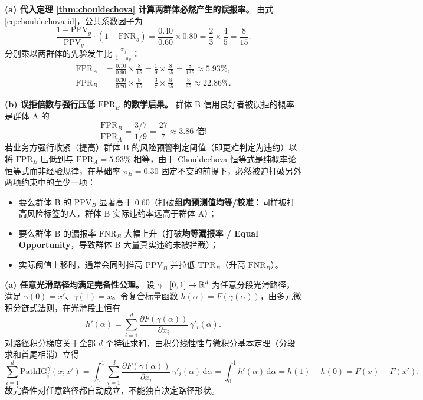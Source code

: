 \textbf{(a) 代入定理 \ref{thm:chouldechova} 计算两群体必然产生的误报率。}
由式 \eqref{eq:chouldechova-id}，公共系数因子为
\[
  \frac{1 - \mathrm{PPV}_g}{\mathrm{PPV}_g}\cdot(1 - \mathrm{FNR}_g)
  = \frac{0.40}{0.60} \times 0.80
  = \frac{2}{3} \times \frac{4}{5}
  = \frac{8}{15}.
\]
分别乘以两群体的先验发生比 $\frac{\pi_g}{1 - \pi_g}$：
\begin{align*}
  \mathrm{FPR}_A &= \frac{0.10}{0.90} \times \frac{8}{15}
                  = \frac{1}{9} \times \frac{8}{15}
                  = \frac{8}{135} \approx \mathbf{5.93\%}, \\
  \mathrm{FPR}_B &= \frac{0.30}{0.70} \times \frac{8}{15}
                  = \frac{3}{7} \times \frac{8}{15}
                  = \frac{8}{35} \approx \mathbf{22.86\%}.
\end{align*}

\textbf{(b) 误拒倍数与强行压低 $\mathrm{FPR}_B$ 的数学后果。}
群体 B 信用良好者被误拒的概率是群体 A 的
\[
  \frac{\mathrm{FPR}_B}{\mathrm{FPR}_A}
  = \frac{3/7}{1/9} = \frac{27}{7} \approx \mathbf{3.86} \text{ 倍}!
\]
若业务方强行收紧（提高）群体 B 的风险预警判定阈值（即更难判定为违约）以将 $\mathrm{FPR}_B$ 压低到与 $\mathrm{FPR}_A = 5.93\%$ 相等，由于 Chouldechova 恒等式是纯概率论恒等式而非经验规律，在基础率 $\pi_B = 0.30$ 固定不变的前提下，必然被迫打破另外两项约束中的至少一项：
\begin{itemize}
  \item 要么群体 B 的 $\mathrm{PPV}_B$ 显著高于 $0.60$（打破\textbf{组内预测值均等/校准}：同样被打高风险标签的人，群体 B 实际违约率远高于群体 A）；
  \item 要么群体 B 的漏报率 $\mathrm{FNR}_B$ 大幅上升（打破\textbf{均等漏报率 / Equal Opportunity}，导致群体 B 大量真实违约未被拦截）；
  \item 实际阈值上移时，通常会同时推高 $\mathrm{PPV}_B$ 并拉低 $\mathrm{TPR}_B$（升高 $\mathrm{FNR}_B$）。
\end{itemize}


\textbf{(a) 任意光滑路径均满足完备性公理。}
设 $\gamma: [0,1] \to \mathbb{R}^d$ 为任意分段光滑路径，满足 $\gamma(0) = x'$、$\gamma(1) = x$。令复合标量函数 $h(\alpha) = F(\gamma(\alpha))$，由多元微积分链式法则，在光滑段上恒有
\[
  h'(\alpha) = \sum_{i=1}^d \frac{\partial F(\gamma(\alpha))}{\partial x_i}\,\gamma'_i(\alpha).
\]
对路径积分梯度关于全部 $d$ 个特征求和，由积分线性性与微积分基本定理（分段求和首尾相消）立得
\[
  \sum_{i=1}^d \mathrm{PathIG}_i^\gamma(x; x')
  = \int_0^1 \sum_{i=1}^d \frac{\partial F(\gamma(\alpha))}{\partial x_i}\,\gamma'_i(\alpha)\,\mathrm{d}\alpha
  = \int_0^1 h'(\alpha)\,\mathrm{d}\alpha
  = h(1) - h(0)
  = F(x) - F(x').
\]
故完备性对任意路径都自动成立，不能独自决定路径形状。


